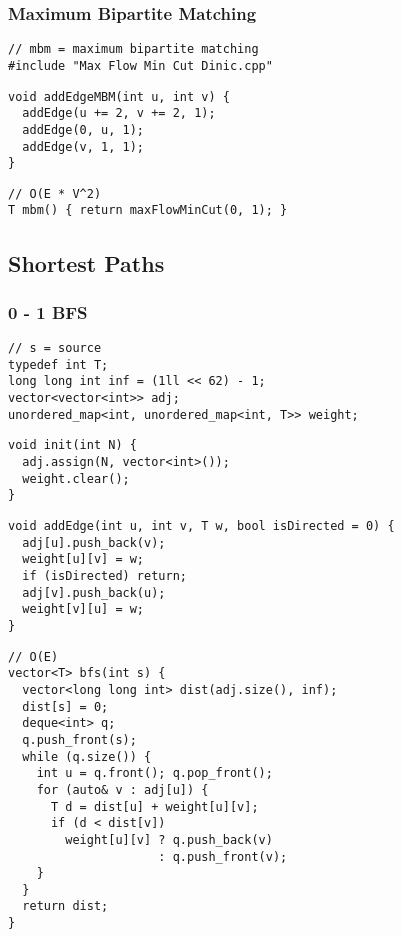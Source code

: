 \documentclass[twoside]{article}
\begin{document}
\begin{multicols*}{2}
\subsubsectionfont{\large\bfseries\sffamily\underline}
\subsubsection*{Maximum Bipartite Matching}
\begin{verbatim}
// mbm = maximum bipartite matching
#include "Max Flow Min Cut Dinic.cpp"
\end{verbatim}
\vspace{-12pt}
\begin{verbatim}
void addEdgeMBM(int u, int v) {
  addEdge(u += 2, v += 2, 1);
  addEdge(0, u, 1);
  addEdge(v, 1, 1);
}
\end{verbatim}
\vspace{-12pt}
\begin{verbatim}
// O(E * V^2)
T mbm() { return maxFlowMinCut(0, 1); }
\end{verbatim}

\subsectionfont{\bfseries\sffamily\centering\LARGE}
\vspace{0em}
\subsection*{Shortest Paths}
\vspace{2em}
\subsubsectionfont{\large\bfseries\sffamily\underline}
\subsubsection*{0 - 1 BFS}
\begin{verbatim}
// s = source
typedef int T;
long long int inf = (1ll << 62) - 1;
vector<vector<int>> adj;
unordered_map<int, unordered_map<int, T>> weight;
\end{verbatim}
\vspace{-12pt}
\begin{verbatim}
void init(int N) {
  adj.assign(N, vector<int>());
  weight.clear();
}
\end{verbatim}
\vspace{-12pt}
\begin{verbatim}
void addEdge(int u, int v, T w, bool isDirected = 0) {
  adj[u].push_back(v);
  weight[u][v] = w;
  if (isDirected) return;
  adj[v].push_back(u);
  weight[v][u] = w;
}
\end{verbatim}
\vspace{-12pt}
\begin{verbatim}
// O(E)
vector<T> bfs(int s) {
  vector<long long int> dist(adj.size(), inf);
  dist[s] = 0;
  deque<int> q;
  q.push_front(s);
  while (q.size()) {
    int u = q.front(); q.pop_front();
    for (auto& v : adj[u]) {
      T d = dist[u] + weight[u][v];
      if (d < dist[v])
        weight[u][v] ? q.push_back(v)
                     : q.push_front(v);
    }
  }
  return dist;
}
\end{verbatim}


\end{multicols*}
\end{document}
